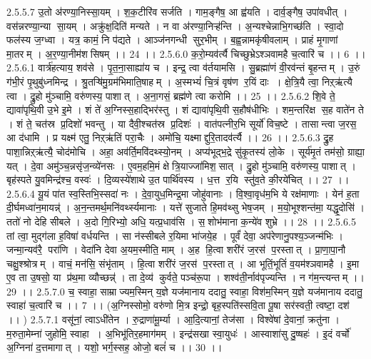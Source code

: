 2.5.5.7
उ॒तो अ॑रण्या॒निस्सा॒यम् । श॒क॒टीरि॑व सर्जति । गाम॒ङ्गैष॒ आ ह्व॑यति । दार्व॒ङ्गैष॒ उपा॑वधीत् । वस॑न्नरण्या॒न्या सा॒यम् । अक्रु॑क्ष॒दिति॑ मन्यते । न वा अ॑रण्या॒निऱ्ह॑न्ति । अ॒न्यश्चेन्नाभि॒गच्छ॑ति । स्वा॒दो फल॑स्य ज॒ग्ध्वा । यत्र॒ कामं॒ नि प॑द्यते । आञ्ज॑नगन्धी सुर॒भीम् । ब॒ह्व॒न्नामकृ॑षीवलाम् । प्राहं मृ॒गाणां मा॒तरम् । अ॒र॒ण्या॒नीम॑शसिषम् ।। 24 ।।
2.5.6.0
क॒रो॒म्यव॑र्त्यै चिच्छुभ्रेऽश्ञवामहै च॒त्वारि॑ च ।। 6 ।।
2.5.6.1
वार्त्र॑हत्याय॒ शव॑से । पृ॒त॒ना॒साह्या॑य च । इन्द्र॒ त्वा व॑र्तयामसि । सु॒ब्रह्मा॑णं वी॒रव॑न्तं बृ॒हन्तम् । उ॒रुं ग॑भी॒रं पृ॒थुबु॑ध्नमिन्द्र । श्रु॒तऱ्षि॑मु॒ग्रम॑भिमाति॒षाहम् । अ॒स्मभ्यं॑ चि॒त्रं वृष॑ण र॒यिं दाः । क्षे॒त्रि॒यै त्वा॒ निऱ्ऋ॑त्यै त्वा । द्रु॒हो मु॑ञ्चामि॒ वरु॑णस्य॒ पाशात् । अ॒ना॒गसं॒ ब्रह्म॑णे त्वा करोमि ।। 25 ।।
2.5.6.2
शि॒वे ते॒ द्यावा॑पृथि॒वी उ॒भे इ॒मे । शं ते॑ अ॒ग्निस्स॒हाद्भिर॑स्तु । शं द्यावा॑पृथि॒वी स॒हौष॑धीभिः । शम॒न्तरि॑क्ष स॒ह वाते॑न ते । शं ते॒ चत॑स्र प्र॒दिशो॑ भवन्तु । या दैवी॒श्चत॑स्र प्र॒दिशः॑ । वात॑पत्नीर॒भि सूर्यो॑ विच॒ष्टे । तासान्त्वा ज॒रस॒ आ द॑धामि । प्र यक्ष्म॑ एतु॒ निऱ्ऋ॑तिं परा॒चैः । अमो॑चि॒ यक्ष्माद्दुरि॒तादव॑र्त्यै ।। 26 ।।
2.5.6.3
द्रु॒ह पाशा॒न्निऱ्ऋ॑त्यै॒ चोद॑मोचि । अहा॒ अव॑र्ति॒मवि॑दथ्स्यो॒नम् । अप्य॑भूद्भ॒द्रे सु॑कृ॒तस्य॑ लो॒के । सूर्य॑मृ॒तं तम॑सो॒ ग्राह्या॒ यत् । दे॒वा अमु॑ञ्च॒न्नसृ॑ज॒न्व्ये॑नसः । ए॒वम॒हमि॒मं क्षेत्रि॒याज्जा॑मिश॒॒सात् । द्रु॒हो मु॑ञ्चामि॒ वरु॑णस्य॒ पाशात् । बृह॑स्पते यु॒वमिन्द्र॑श्च॒ वस्वः॑ । दि॒व्यस्ये॑शाथे उ॒त पार्थि॑वस्य । ध॒त्त र॒यि स्तु॑व॒ते की॒रये॑चित् ।। 27 ।।
2.5.6.4
यू॒यं पा॑त स्व॒स्तिभि॒स्सदा॑ नः । दे॒वा॒युध॒मिन्द्र॒मा जोहु॑वानाः । वि॒श्वा॒वृध॑म॒भि ये रक्ष॑माणाः । येन॑ ह॒ता दी॒र्घमध्वा॑न॒मायन्न्॑ । अ॒न॒न्तमर्थ॒मनि॑वर्थ्स्यमानाः । यत्ते॑ सुजाते हि॒मव॑थ्सु भेष॒जम् । म॒यो॒भूश्शन्त॑मा॒ यद्धृ॒दोसि॑ । ततो॑ नो देहि सीबले । अ॒दो गि॒रिभ्यो॒ अधि॒ यत्प्र॒धाव॑सि । स॒॒शोभ॑माना क॒न्ये॑व शुभ्रे ।। 28 ।।
2.5.6.5
तां त्वा॒ मुद्ग॑ला ह॒विषा॑ वर्धयन्ति । सा न॑स्सीबले र॒यिमा भा॑जये॒ह । पूर्वं॑ देवा॒ अप॑रेणानु॒पश्य॒ञ्जन्म॑भिः । जन्मा॒न्यव॑रै॒ परा॑णि । वेदा॑नि देवा अ॒यम॒स्मीति॒ माम् । अ॒ह हि॒त्वा शरी॑रं ज॒रस॑ प॒रस्तात् । प्रा॒णा॒पा॒नौ चक्षु॒श्श्रोत्रम् । वाचं॒ मन॑सि॒ संभृ॑ताम् । हि॒त्वा शरी॑रं ज॒रस॑ प॒रस्तात् । आ भूतिं॒भूतिं॑ व॒यम॑श्ञवामहै । इ॒मा ए॒व ता उ॒षसो॒ या प्र॑थ॒मा व्यौच्छन्न्॑ । ता दे॒व्य॑ कुर्वते॒ पञ्च॑रू॒पा । शश्व॑ती॒र्नाव॑पृज्यन्ति । न ग॑म॒न्त्यन्तम् ।। 29 ।।
2.5.7.0
च॒ स्वाहा॒ साम्राज्यम॒स्मिन् य॒ज्ञे यज॑मानाय ददातु॒ स्वाहा॒ विश॑म॒स्मिन् य॒ज्ञे यज॑मानाय ददातु॒ स्वाहा॑ च॒त्वारि॑ च ।। 7 ।। (अ॒ग्निस्सोमो॒ वरु॑णो मि॒त्र इन्द्रो॒ बृह॒स्पति॑स्सवि॒ता पू॒षा सर॑स्वती॒ त्वष्टा॒ दश॑ ।। )
2.5.7.1
वसू॑नां॒ त्वाऽधी॑तेन । रु॒द्राणा॑मू॒र्म्या । आ॒दि॒त्यानां॒ तेज॑सा । विश्वे॑षां दे॒वानां॒ क्रतु॑ना । म॒रुता॒मेम्ना॑ जुहोमि॒ स्वाहा । अ॒भिभू॑तिर॒हमाग॑मम् । इन्द्र॑सखा स्वा॒युधः॑ । आस्वाशा॑सु दु॒ष्षहः॑ । इ॒दं वर्चो॑ अ॒ग्निना॑ द॒त्तमागात् । यशो॒ भर्ग॒स्सह॒ ओजो॒ बलं॑ च ।। 30 ।।
